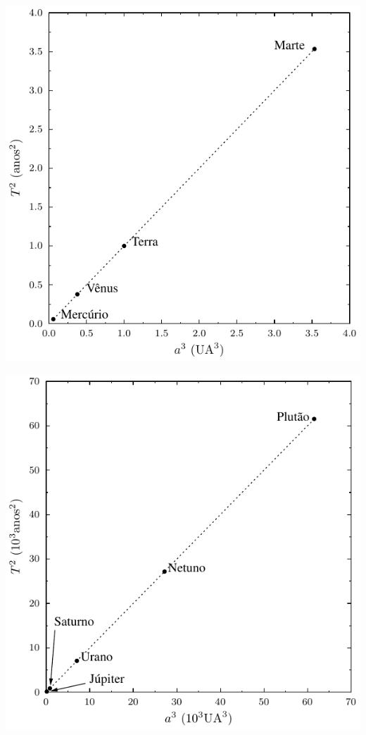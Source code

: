 \documentclass[a4paper]{article}
\begin{document}
\begin{respostas}
\begin{exercicio}
\begin{enumerate}
  \noindent
    \begin{minipage}{0.45\textwidth}
    \includegraphics[width=\textwidth]{3a_lei_Kepler_Mercurio-Marte}
    \end{minipage}\hfill
    \begin{minipage}{0.45\textwidth}
    \includegraphics[width=\textwidth]{3a_lei_Kepler_Jupiter-Plutao}
    \end{minipage}
    

\end{enumerate}
\end{exercicio}
\end{respostas}
\end{document}
